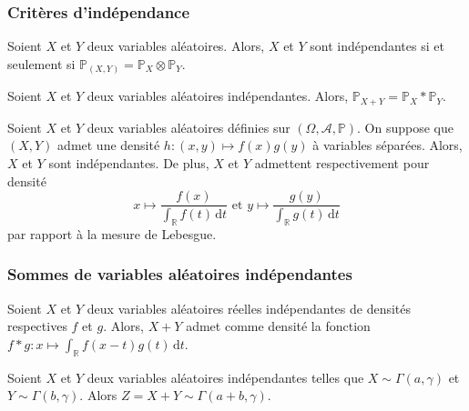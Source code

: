   \subsubsection{Critères d'indépendance}


  \begin{theorem}
    Soient $X$ et $Y$ deux variables aléatoires. Alors, $X$ et $Y$ sont indépendantes si et seulement si $\mathbb{P}_{(X,Y)} = \mathbb{P}_X \otimes \mathbb{P}_Y$.
  \end{theorem}

  \begin{corollary}
    Soient $X$ et $Y$ deux variables aléatoires indépendantes. Alors, $\mathbb{P}_{X+Y} = \mathbb{P}_X * \mathbb{P}_Y$.
  \end{corollary}


  \begin{proposition}
    Soient $X$ et $Y$ deux variables aléatoires définies sur $(\Omega, \mathcal{A}, \mathbb{P})$. On suppose que $(X,Y)$ admet une densité $h : (x,y) \mapsto f(x) g(y)$ à variables séparées. Alors, $X$ et $Y$ sont indépendantes. De plus, $X$ et $Y$ admettent respectivement pour densité
    \[ x \mapsto \frac{f(x)}{\int_{\mathbb{R}} f(t) \, \mathrm{d}t} \text{ et } y \mapsto \frac{g(y)}{\int_{\mathbb{R}} g(t) \, \mathrm{d}t} \]
    par rapport à la mesure de Lebesgue.
  \end{proposition}

  \subsubsection{Sommes de variables aléatoires indépendantes}


  \begin{theorem}
    Soient $X$ et $Y$ deux variables aléatoires réelles indépendantes de densités respectives $f$ et $g$. Alors, $X + Y$ admet comme densité la fonction $f * g : x \mapsto \int_{\mathbb{R}} f(x-t) g(t) \, \mathrm{d}t$.
  \end{theorem}

  \begin{application}
    Soient $X$ et $Y$ deux variables aléatoires indépendantes telles que $X \sim \Gamma(a, \gamma)$ et $Y \sim \Gamma(b, \gamma)$. Alors $Z = X + Y \sim \Gamma(a+b, \gamma)$.
  \end{application}

